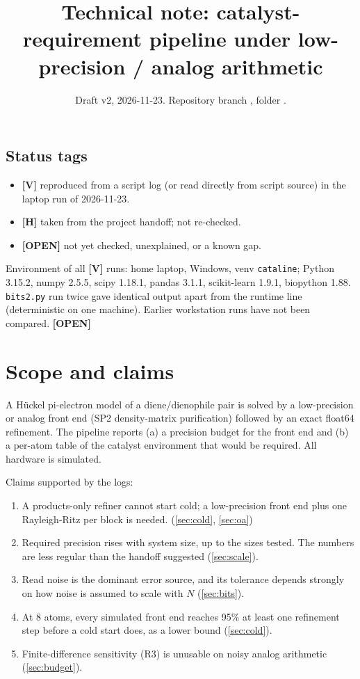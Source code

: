 \documentclass[11pt]{article}
\title{Technical note: catalyst-requirement pipeline under low-precision / analog arithmetic}
\author{}
\date{Draft v2, 2026-11-23. Repository branch \scr{cataline}, folder \scr{catalyst/}.}
\newcommand{\V}{\textbf{[V]}}
\newcommand{\Hh}{\textbf{[H]}}
\newcommand{\OPEN}{\textbf{[OPEN]}}
\newcommand{\scr}[1]{\texttt{#1}}
\begin{document}
\maketitle

\subsection*{Status tags}
\begin{itemize}
  \item \V{} reproduced from a script log (or read directly from script source) in the laptop run of 2026-11-23.
  \item \Hh{} taken from the project handoff; not re-checked.
  \item \OPEN{} not yet checked, unexplained, or a known gap.
\end{itemize}

Environment of all \V{} runs: home laptop, Windows, venv \scr{cataline}; Python 3.15.2, numpy 2.5.5, scipy 1.18.1, pandas 3.1.1, scikit-learn 1.9.1, biopython 1.88. \scr{bits2.py} run twice gave identical output apart from the runtime line (deterministic on one machine). Earlier workstation runs have not been compared. \OPEN

\section{Scope and claims}

A H\"uckel pi-electron model of a diene/dienophile pair is solved by a low-precision or analog front end (SP2 density-matrix purification) followed by an exact float64 refinement. The pipeline reports (a) a precision budget for the front end and (b) a per-atom table of the catalyst environment that would be required. All hardware is simulated.

Claims supported by the logs:
\begin{enumerate}
  \item A products-only refiner cannot start cold; a low-precision front end plus one Rayleigh-Ritz per block is needed. (\ref{sec:cold}, \ref{sec:oa})
  \item Required precision rises with system size, up to the sizes tested. The numbers are less regular than the handoff suggested (\ref{sec:scale}).
  \item Read noise is the dominant error source, and its tolerance depends strongly on how noise is assumed to scale with $N$ (\ref{sec:bits}).
  \item At 8 atoms, every simulated front end reaches 95\% at least one refinement step before a cold start does, as a lower bound (\ref{sec:cold}).
  \item Finite-difference sensitivity (R3) is unusable on noisy analog arithmetic (\ref{sec:budget}).
\end{enumerate}
\end{document}
